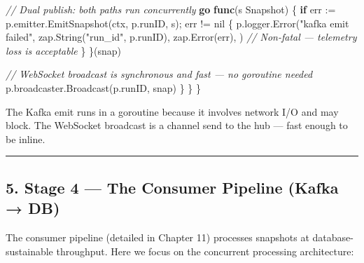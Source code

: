 \documentclass[
]{article}
\newenvironment{Shaded}{}{}
\newcommand{\CommentTok}[1]{\textcolor[rgb]{0.38,0.63,0.69}{\textit{#1}}}
\newcommand{\ControlFlowTok}[1]{\textcolor[rgb]{0.00,0.44,0.13}{\textbf{#1}}}
\newcommand{\KeywordTok}[1]{\textcolor[rgb]{0.00,0.44,0.13}{\textbf{#1}}}
\newcommand{\NormalTok}[1]{#1}
\newcommand{\OperatorTok}[1]{\textcolor[rgb]{0.40,0.40,0.40}{#1}}
\newcommand{\OtherTok}[1]{\textcolor[rgb]{0.00,0.44,0.13}{#1}}
\newcommand{\StringTok}[1]{\textcolor[rgb]{0.25,0.44,0.63}{#1}}
\begin{document}
\begin{Shaded}
\begin{Highlighting}[]
            \CommentTok{// Dual publish: both paths run concurrently}
            \ControlFlowTok{go} \KeywordTok{func}\OperatorTok{(}\NormalTok{s Snapshot}\OperatorTok{)} \OperatorTok{\{}
                \ControlFlowTok{if}\NormalTok{ err }\OperatorTok{:=}\NormalTok{ p}\OperatorTok{.}\NormalTok{emitter}\OperatorTok{.}\NormalTok{EmitSnapshot}\OperatorTok{(}\NormalTok{ctx}\OperatorTok{,}\NormalTok{ p}\OperatorTok{.}\NormalTok{runID}\OperatorTok{,}\NormalTok{ s}\OperatorTok{);}\NormalTok{ err }\OperatorTok{!=} \OtherTok{nil} \OperatorTok{\{}
\NormalTok{                    p}\OperatorTok{.}\NormalTok{logger}\OperatorTok{.}\NormalTok{Error}\OperatorTok{(}\StringTok{"kafka emit failed"}\OperatorTok{,}
\NormalTok{                        zap}\OperatorTok{.}\NormalTok{String}\OperatorTok{(}\StringTok{"run\_id"}\OperatorTok{,}\NormalTok{ p}\OperatorTok{.}\NormalTok{runID}\OperatorTok{),}
\NormalTok{                        zap}\OperatorTok{.}\NormalTok{Error}\OperatorTok{(}\NormalTok{err}\OperatorTok{),}
                    \OperatorTok{)}
                    \CommentTok{// Non{-}fatal — telemetry loss is acceptable}
                \OperatorTok{\}}
            \OperatorTok{\}(}\NormalTok{snap}\OperatorTok{)}

            \CommentTok{// WebSocket broadcast is synchronous and fast — no goroutine needed}
\NormalTok{            p}\OperatorTok{.}\NormalTok{broadcaster}\OperatorTok{.}\NormalTok{Broadcast}\OperatorTok{(}\NormalTok{p}\OperatorTok{.}\NormalTok{runID}\OperatorTok{,}\NormalTok{ snap}\OperatorTok{)}
        \OperatorTok{\}}
    \OperatorTok{\}}
\OperatorTok{\}}
\end{Highlighting}
\end{Shaded}

The Kafka emit runs in a goroutine because it involves network I/O and
may block. The WebSocket broadcast is a channel send to the hub --- fast
enough to be inline.

\begin{center}\rule{0.5\linewidth}{0.5pt}\end{center}

\hypertarget{stage-4-the-consumer-pipeline-kafka-db}{%
\subsection{5. Stage 4 --- The Consumer Pipeline (Kafka →
DB)}\label{stage-4-the-consumer-pipeline-kafka-db}}

The consumer pipeline (detailed in Chapter 11) processes snapshots at
database-sustainable throughput. Here we focus on the concurrent
processing architecture:
\end{document}

